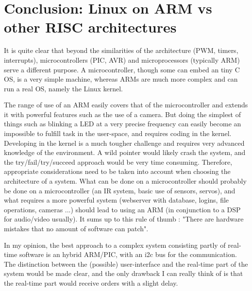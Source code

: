 \chapter{Conclusion: Linux on ARM vs other RISC architectures }

It is quite clear that beyond the similarities of the architecture (PWM, timers, interrupts), microcontrollers (PIC, AVR) and microprocessors (typically ARM) serve a different purpose. A microcontroller, though some can embed an tiny C OS, is a very simple machine, whereas ARMs are much more complex and can run a real OS, namely the Linux kernel.

The range of use of an ARM easily covers that of the microcontroller and extends it with powerful features such as the use of a camera. But doing the simplest of things such as blinking a LED at a very precise frequency can easily become an impossible to fulfill task in the user-space, and requires coding in the kernel. Developing in the kernel is a much tougher challenge and requires very advanced knowledge of the environment. A wild pointer would likely crash the system, and the try/fail/try/succeed approach would be very time consuming.
Therefore, appropriate considerations need to be taken into account when choosing the architecture of a system. What can be done on a microcontroller should probably be done on a microcontroller (an IR system, basic use of sensors, servos), and what requires a more powerful system (webserver with database, logins, file operations, cameras ...) should lead to using an ARM (in conjunction to a DSP for audio/video usually). It sums up to this rule of thumb :
"There are hardware mistakes that no amount of software can patch".

In my opinion, the best approach to a complex system consisting partly of real-time software is an hybrid ARM/PIC, with an i2c bus for the communication. The distinction between the (possible) user-interface and the real-time part of the system would be made clear, and the only drawback I can really think of is that the real-time part would receive orders with a slight delay.

